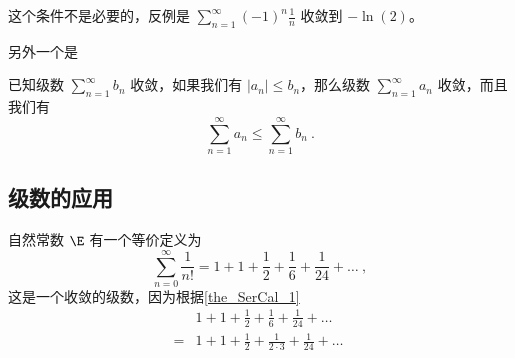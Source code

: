 这个条件不是必要的，反例是 $\sum_{n = 1}^\infty (-1)^n\frac1{n}$ 收敛到 $-\ln(2)$。

另外一个是
\begin{theorem}{}\label{the_SerCal_1}
已知级数 $\sum_{n=1}^\infty b_n$ 收敛，如果我们有 $|a_n| \leq b_n$，那么级数 $\sum_{n=1}^\infty a_n$ 收敛，而且我们有
$$
\sum_{n=1}^\infty a_n \leq \sum_{n=1}^\infty b_n ~.
$$
\end{theorem}




\subsection{级数的应用}



自然常数 $\E$ 有一个等价定义为
\begin{equation}
\sum_{n=0}^\infty \frac{1}{n!} = 1 + 1 + \frac{1}{2} + \frac{1}{6} + \frac{1}{24} + \dots~,
\end{equation}
这是一个收敛的级数，因为根据\autoref{the_SerCal_1} 
$$
\begin{aligned}
\phantom{=}& 1 + 1 + \frac{1}{2} + \frac{1}{6} + \frac{1}{24} + \dots \\
=& 1 + 1 + \frac{1}{2} + \frac{1}{2 \cdot 3} + \frac{1}{24} + \dots
\end{aligned}~
$$
